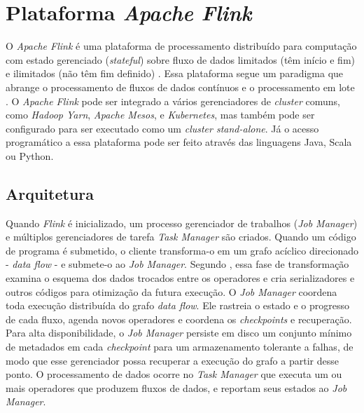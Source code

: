 


\section{Plataforma \emph{Apache Flink}}

O \emph{Apache Flink} é uma plataforma de processamento distribuído para
computação com estado gerenciado (\emph{stateful}) sobre fluxo de dados limitados (têm início e
fim) e ilimitados (não têm fim definido) \cite{ApacheFlink2020}.
Essa plataforma segue um paradigma que abrange o processamento de fluxos de
dados contínuos e o processamento em lote \cite{Carbone2015,Lopez2018}.
O \emph{Apache Flink} pode ser integrado a vários gerenciadores de \emph{cluster}
comuns, como \emph{Hadoop Yarn}, \emph{Apache Mesos}, e \emph{Kubernetes}, mas também pode ser
configurado para ser executado como um \emph{cluster stand-alone}.
Já o acesso programático a essa plataforma pode ser feito através das linguagens
Java, Scala ou Python.

\subsection{Arquitetura}

Quando \emph{Flink} é inicializado, um processo gerenciador de trabalhos
(\emph{Job Manager}) e múltiplos gerenciadores de tarefa \emph{Task Manager} são criados.
Quando um código de programa é submetido, o cliente transforma-o em um grafo
acíclico direcionado - \emph{data flow} - e submete-o ao \emph{Job Manager}.
Segundo , essa fase de transformação examina o esquema
dos dados trocados entre os operadores e cria serializadores e
outros códigos para otimização da futura execução.
O \emph{Job Manager} coordena toda execução distribuída do grafo \emph{data
flow}. Ele rastreia o estado e o progresso de cada fluxo, agenda novos
operadores e coordena os \emph{checkpoints} e recuperação.
Para alta disponibilidade, o \emph{Job Manager} persiste em disco um conjunto mínimo de
metadados em cada \emph{checkpoint} para um armazenamento tolerante a falhas, de
modo que esse gerenciador possa recuperar a execução do grafo a partir desse
ponto.
O processamento de dados ocorre no \emph{Task Manager} que executa um ou mais
operadores que produzem fluxos de dados, e reportam seus estados ao \emph{Job
Manager}.

